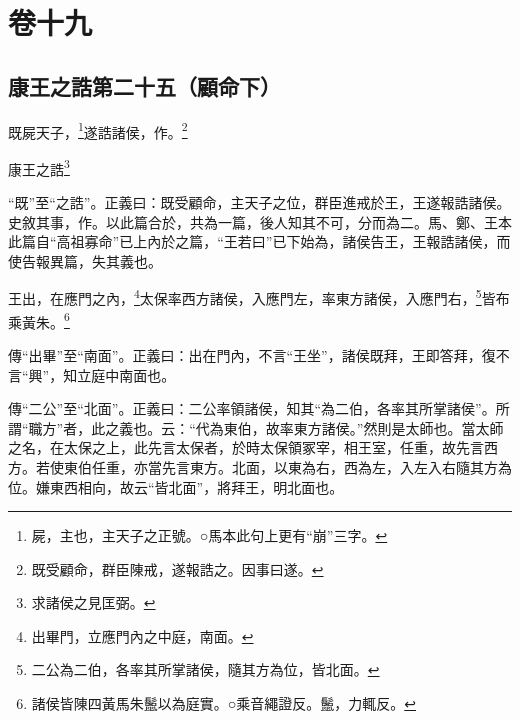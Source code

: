 

\chapter{卷十九}


\section{康王之誥第二十五（顧命下）}


既屍天子，\footnote{屍，主也，主天子之正號。○馬本此句上更有“崩”三字。}遂誥諸侯，作。\footnote{既受顧命，群臣陳戒，遂報誥之。因事曰遂。}

康王之誥\footnote{求諸侯之見匡弼。}

{\noindent\shu{}\fzkt “既”至“之誥”。正義曰：既受顧命，主天子之位，群臣進戒於王，王遂報誥諸侯。史敘其事，作。以此篇合於，共為一篇，後人知其不可，分而為二。馬、鄭、王本此篇自“高祖寡命”已上內於之篇，“王若曰”已下始為，諸侯告王，王報誥諸侯，而使告報異篇，失其義也。 \par}

王出，在應門之內，\footnote{出畢門，立應門內之中庭，南面。}太保率西方諸侯，入應門左，率東方諸侯，入應門右，\footnote{二公為二伯，各率其所掌諸侯，隨其方為位，皆北面。}皆布乘黃朱。\footnote{諸侯皆陳四黃馬朱鬛以為庭實。○乘音繩證反。鬛，力輒反。}


{\noindent\zhuan{}\fzbyks 傳“出畢”至“南面”。正義曰：出在門內，不言“王坐”，諸侯既拜，王即答拜，復不言“興”，知立庭中南面也。 \par}

{\noindent\zhuan{}\fzbyks 傳“二公”至“北面”。正義曰：二公率領諸侯，知其“為二伯，各率其所掌諸侯”。所謂“職方”者，此之義也。云：“代為東伯，故率東方諸侯。”然則是太師也。當太師之名，在太保之上，此先言太保者，於時太保領冢宰，相王室，任重，故先言西方。若使東伯任重，亦當先言東方。北面，以東為右，西為左，入左入右隨其方為位。嫌東西相向，故云“皆北面”，將拜王，明北面也。 \par}

